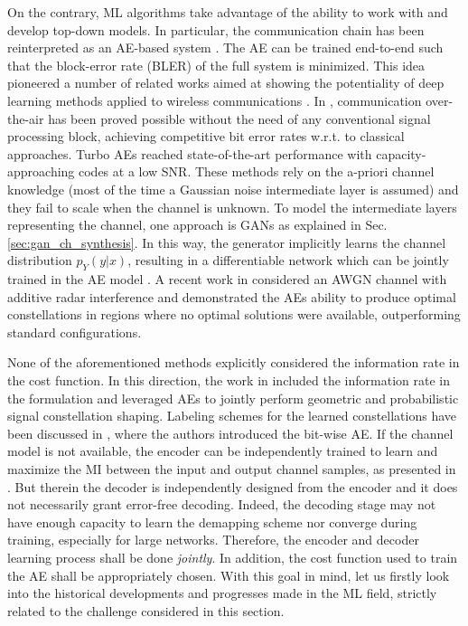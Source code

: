 On the contrary, ML algorithms take advantage of the ability to work with and develop top-down models. In particular, the communication chain has been reinterpreted as an AE-based system \cite{Oshea2017}.
The AE can be trained end-to-end such that the block-error rate (BLER) of the full system is minimized. 
This idea pioneered a number of related works aimed at showing the potentiality of deep learning methods applied to wireless communications \cite{Dorner2018, TurboAE, Alberge2019, OFDM_AE}. In \cite{Dorner2018}, communication over-the-air has been proved possible without the need of any conventional signal processing block, achieving competitive bit error rates w.r.t. to classical approaches. Turbo AEs \cite{TurboAE} reached state-of-the-art performance with capacity-approaching codes at a low SNR. These methods rely on the a-priori channel knowledge (most of the time a Gaussian noise intermediate layer is assumed) and they fail to scale when the channel is unknown. To model the intermediate layers representing the channel, one approach is GANs as explained in Sec. \ref{sec:gan_ch_synthesis}. In this way, the generator implicitly learns the channel distribution $p_Y(y|x)$, resulting in a differentiable network which can be jointly trained in the AE model \cite{OsheaGAN, RighiniLetizia2019, Letizia2019a}. A recent work in \cite{Alberge2019} considered an AWGN channel with additive radar interference and demonstrated the AEs ability to produce optimal constellations in regions where no optimal solutions were available, outperforming standard configurations. 

None of the aforementioned methods explicitly considered the information rate in the cost function. In this direction, the work in \cite{Hoydis2019} included the information rate in the formulation and leveraged AEs to jointly perform geometric and probabilistic signal constellation shaping. Labeling schemes for the learned constellations have been discussed in \cite{Cammerer2020}, where the authors introduced the bit-wise AE. If the channel model is not available, the encoder can be independently trained to learn and maximize the MI between the input and output channel samples, as presented in \cite{Wunder2019}. But therein the decoder is independently designed from the encoder and it does not necessarily grant error-free decoding. Indeed, the decoding stage may not have enough capacity to learn the demapping scheme nor converge during training, especially for large networks. Therefore, the encoder and decoder learning process shall be done \textit{jointly}. In addition, the cost function used to train the AE shall be appropriately chosen. With this goal in mind, let us firstly look into the historical developments and progresses made in the ML field, strictly related to the challenge considered in this section.

